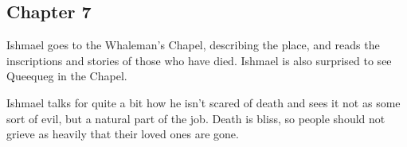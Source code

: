 \subsection{Chapter 7}

Ishmael goes to the Whaleman's Chapel, describing the place, and reads the
inscriptions and stories of those who have died. Ishmael is also surprised to
see Queequeg in the Chapel.

Ishmael talks for quite a bit how he isn't scared of death and sees it not as
some sort of evil, but a natural part of the job. Death is bliss, so people
should not grieve as heavily that their loved ones are gone.
